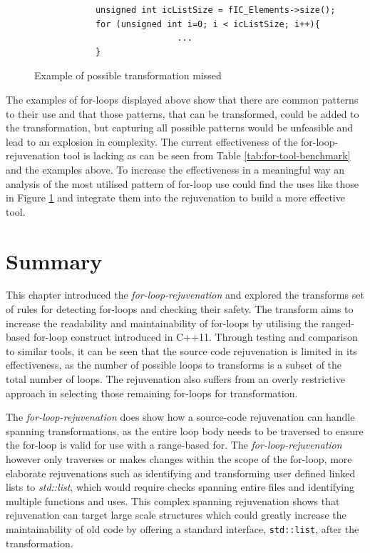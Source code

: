 \documentclass[bsc,frontabs,singlespacing,twoside,parskip,deptreport]{infthesis}
\begin{document}
\begin{figure}[H]
    \centering
    \begin{verbatim}
            unsigned int icListSize = fIC_Elements->size();
            for (unsigned int i=0; i < icListSize; i++){ 
                            ... 
            }
    \end{verbatim}
    \caption{Example of possible transformation missed}
    \label{fig:no-rejuv-indirect-var}
\end{figure}

The examples of for-loops displayed above show that there are common patterns to their use and that those patterns, that can be transformed, could be added to the transformation, but capturing all possible patterns would be unfeasible and lead to an explosion in complexity. The current effectiveness of the for-loop-rejuvenation tool is lacking as can be seen from Table \ref{tab:for-tool-benchmark} and the examples above. To increase the effectiveness in a meaningful way an analysis of the most utilised pattern of for-loop use could find the uses like those in Figure \ref{fig:no-rejuv-indirect-var} and integrate them into the rejuvenation to build a more effective tool.

\section{Summary}
This chapter introduced the \textit{for-loop-rejuvenation} and explored the transforms set of rules for detecting for-loops and checking their safety. The transform aims to increase the readability and maintainability of for-loops by utilising the ranged-based for-loop construct introduced in C++11. Through testing and comparison to similar tools, it can be seen that the source code rejuvenation is limited in its effectiveness, as the number of possible loops to transforms is a subset of the total number of loops. The rejuvenation also suffers from an overly restrictive approach in selecting those remaining for-loops for transformation.

The \textit{for-loop-rejuvenation} does show how a source-code rejuvenation can handle spanning transformations, as the entire loop body needs to be traversed to ensure the for-loop is valid for use with a range-based for. The \textit{for-loop-rejuvenation} however only traverses or makes changes within the scope of the for-loop, more elaborate rejuvenations such as identifying and transforming user defined linked lists to\textit{ std::list}, which would require checks spanning entire files and identifying multiple functions and uses. This complex spanning rejuvenation shows that rejuvenation can target large scale structures which could greatly increase the maintainability of old code by offering a standard interface, \texttt{std::list}, after the transformation.
\end{document}

